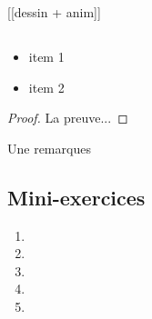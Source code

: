 [[dessin + anim]]

\subsection{}



\begin{proposition}
\label{prop:deriv}
\begin{itemize}
  \item item 1
  \item item 2
\end{itemize}
\end{proposition}

\begin{proof}
La preuve...
\end{proof}

\begin{remarque*}
Une remarques
\end{remarque*}


\subsection{Mini-exercices}

\begin{enumerate}
  \item 
  \item 
  \item 
  \item 
  \item 
\end{enumerate}



\section{}

\subsection{}

\subsection{}

